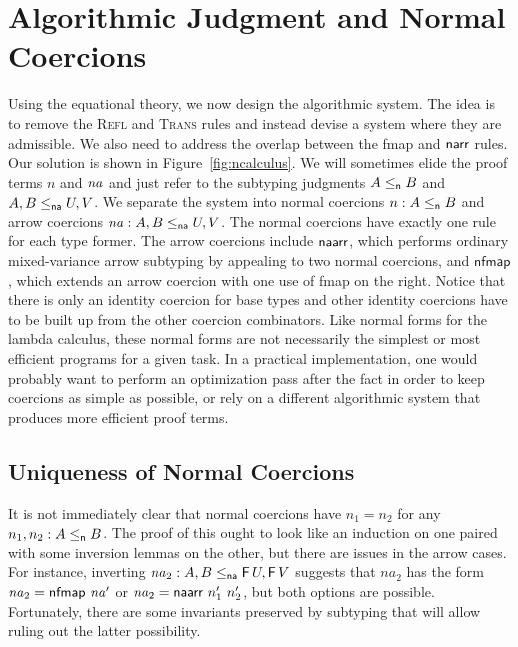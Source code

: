 \documentclass[acmsmall,screen]{acmart}
\begin{document}
\section{Algorithmic Judgment and Normal Coercions}
Using the equational theory, we now design the algorithmic system. The idea is
to remove the \textsc{Refl} and \textsc{Trans} rules and instead devise a system
where they are admissible. We also need to address the overlap between the fmap
and \(\mathsf{narr}\) rules.  Our solution is shown in Figure~\ref{fig:ncalculus}.
We will sometimes elide the proof terms \(n\) and \(\mathit{na}\) and just refer to the
subtyping judgments \(A \leq_{\mathsf{n}} B\) and \(A, B \leq_{\mathsf{na}} U, V\).
We separate the system into normal coercions \(n : A \leq_{\mathsf{n}} B\) and arrow
coercions \(\mathit{na} : A, B \leq_{\mathsf{na}} U, V\). The normal coercions have exactly one
rule for each type former. The arrow coercions include \(\mathsf{naarr}\), which
performs ordinary mixed-variance arrow subtyping by appealing to two normal coercions,
and \(\mathsf{nfmap}\), which extends an arrow coercion with one use of fmap on the right.
Notice that there is only an identity coercion for base types and other identity
coercions have to be built up from the other coercion combinators.
Like normal forms for the lambda calculus, these normal forms are not
necessarily the simplest or most efficient programs for a given task.
In a practical implementation, one would probably want to perform an
optimization pass after the fact in order to keep coercions as simple as
possible, or rely on a different algorithmic system that produces more efficient
proof terms.

\subsection{Uniqueness of Normal Coercions}
It is not immediately clear that normal coercions have \(n_1 = n_2\) for any
\(n_1, n_2 : A \leq_{\mathsf{n}} B\).  The proof of this ought to look like an induction
on one paired with some inversion lemmas on the other, but there are issues in
the arrow cases. For instance, inverting \(\mathit{na}_2 : A, B \leq_{\mathsf{na}} \mathsf{F}\, U, \mathsf{F}\, V\)
suggests that \(na_2\) has the form \(\mathit{na}_2 = \mathsf{nfmap}\ \mathit{na}'\) or
\(\mathit{na}_2 = \mathsf{naarr}\ n_1'\ n_2'\), but both options are possible.
Fortunately, there are some invariants preserved by subtyping that will allow
ruling out the latter possibility.
\end{document}
